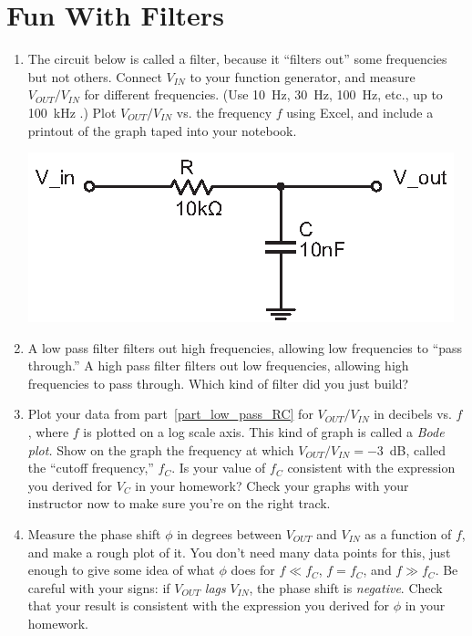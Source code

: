\section{Fun With Filters}
\label{lab_filters}


\bigskip

\begin{enumerate}[wide]

\item The circuit below is called a filter, because it ``filters out'' some frequencies but not others.  Connect $V_{IN}$ to your function generator, and measure $V_{OUT}/V_{IN}$ for different frequencies.  (Use 10~Hz, 30~Hz, 100~Hz, etc., up to 100~kHz .)  Plot $V_{OUT}/V_{IN}$ vs. the frequency $f$ using Excel, and include a printout of the graph taped into your notebook.  \label{part_low_pass_RC}
\begin{center}
\includegraphics{filters/low_pass_filter_RC.eps}
\end{center}

\item A low pass filter filters out high frequencies, allowing low frequencies to ``pass through.''  A high pass filter filters out low frequencies, allowing high frequencies to pass through.  Which kind of filter did you just build?  

\item Plot your data from part~\ref{part_low_pass_RC} for $V_{OUT}/V_{IN}$ in decibels vs. $f$, where $f$ is plotted on a log scale axis.  This kind of graph is called a \textit{Bode plot.}  Show on the graph the frequency at which $V_{OUT}/V_{IN}=-3$~dB, called the ``cutoff frequency,'' $f_C$.  Is your value of $f_C$ consistent with the expression you derived for $V_C$ in your homework?  Check your graphs with your instructor now to make sure you're on the right track.\label{part_low_pass_log_plot}

\item Measure the phase shift $\phi$ in degrees between $V_{OUT}$ and $V_{IN}$ as a function of $f$, and make a rough plot of it.  You don't need many data points for this, just enough to give some idea of what $\phi$ does for $f \ll f_C$, $f = f_C$, and $f \gg f_C$.  Be careful with your signs: if $V_{OUT}$ \textit{lags} $V_{IN}$, the phase shift is \textit{negative}.  Check that your result is consistent with the expression you derived for $\phi$ in your homework.


\end{enumerate}
